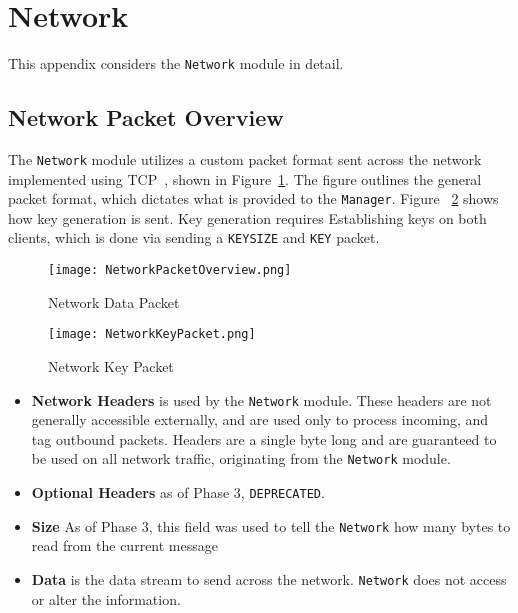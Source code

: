 \documentclass[sigconf]{acmart}
\begin{document}

\appendix
\section{Network} %
This appendix considers the \texttt{Network} module in detail.

\subsection{Network Packet Overview}
The \texttt{Network} module utilizes a custom packet format sent across the network implemented
using TCP~\cite{Postel:rfc793}, shown in Figure~\ref{Network Packet Overview}. The figure outlines
the general packet format, which dictates what is provided to the \texttt{Manager}. Figure
~\ref{Network Key Packet} shows how key generation is sent. Key generation requires Establishing
keys on both clients, which is done via sending a \texttt{KEYSIZE} and \texttt{KEY} packet.
\begin{figure} [htb]
 \centering
 \texttt{[image: NetworkPacketOverview.png]}
 \caption{Network Data Packet}
 \label{Network Packet Overview}
\end{figure}

\begin{figure} [htb]
 \centering
 \texttt{[image: NetworkKeyPacket.png]}
 \caption{Network Key Packet}
 \label{Network Key Packet}
\end{figure}

\begin{itemize}
 \item \textbf{Network Headers} is used by the \texttt{Network} module. These headers are not
       generally accessible externally, and are used only to process incoming, and tag
       outbound packets. Headers are a single byte long and are guaranteed to be used on all
       network traffic, originating from the \texttt{Network} module.
 \item \textbf{Optional Headers} as of Phase 3, \texttt{DEPRECATED}.
 \item \textbf{Size} As of Phase 3, this field was used to tell the \texttt{Network} how many
       bytes to read from the current message
 \item \textbf{Data} is the data stream to send across the network. \texttt{Network} does not
       access or alter the information.
\end{itemize}
\end{document}
